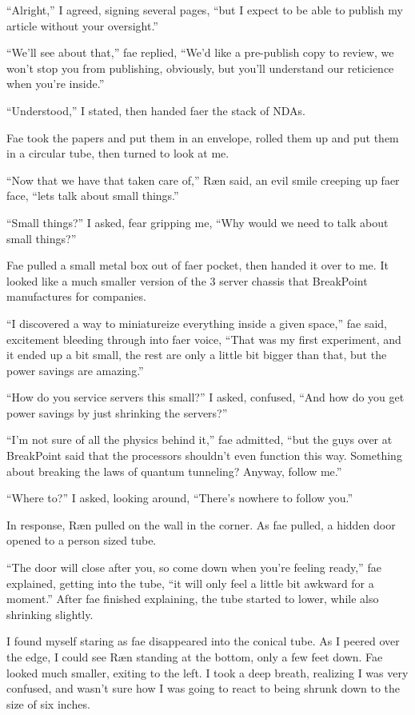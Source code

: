 ``Alright,'' I agreed, signing several pages, ``but I expect to be able to publish my article without your oversight.''

``We'll see about that,'' fae replied, ``We'd like a pre-publish copy to review, we won't stop you from publishing, obviously, but you'll understand our reticience when you're inside.''

``Understood,'' I stated, then handed faer the stack of NDAs.

Fae took the papers and put them in an envelope, rolled them up and put them in a circular tube, then turned to look at me.

``Now that we have that taken care of,'' Ræn said, an evil smile creeping up faer face, ``lets talk about small things.''

``Small things?'' I asked, fear gripping me, ``Why would we need to talk about small things?''

Fae pulled a small metal box out of faer pocket, then handed it over to me.  It looked like a much smaller version of the 3 server chassis that BreakPoint manufactures for companies.

``I discovered a way to miniatureize everything inside a given space,'' fae said, excitement bleeding through into faer voice, ``That was my first experiment, and it ended up a bit small, the rest are only a little bit bigger than that, but the power savings are amazing.''

``How do you service servers this small?'' I asked, confused, ``And how do you get power savings by just shrinking the servers?''

``I'm not sure of all the physics behind it,'' fae admitted, ``but the guys over at BreakPoint said that the processors shouldn't even function this way.  Something about breaking the laws of quantum tunneling?  Anyway, follow me.''

``Where to?'' I asked, looking around, ``There's nowhere to follow you.''

In response, Ræn pulled on the wall in the corner.  As fae pulled, a hidden door opened to a person sized tube.

``The door will close after you, so come down when you're feeling ready,'' fae explained, getting into the tube, ``it will only feel a little bit awkward for a moment.''  After fae finished explaining, the tube started to lower, while also shrinking slightly.

I found myself staring as fae disappeared into the conical tube.  As I peered over the edge, I could see Ræn standing at the bottom, only a few feet down.  Fae looked much smaller, exiting to the left.  I took a deep breath, realizing I was very confused, and wasn't sure how I was going to react to being shrunk down to the size of six inches.

